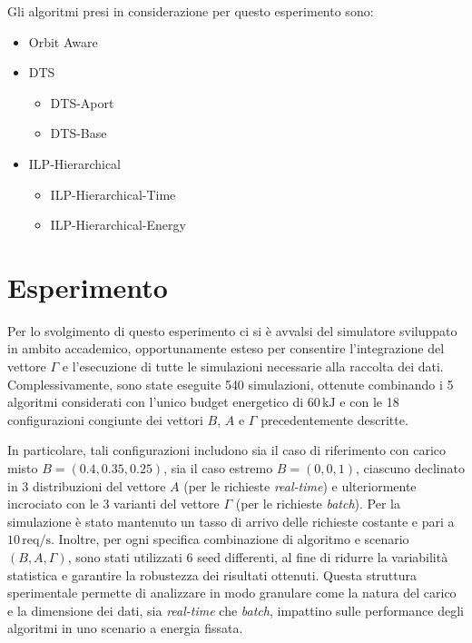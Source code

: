 \documentclass[12pt]{article}
\begin{document}
Gli algoritmi presi in considerazione per questo esperimento sono:
\begin{itemize}
    \item Orbit Aware
    \item DTS
        \begin{itemize}
            \item DTS-Aport
            \item DTS-Base
        \end{itemize}
    \item ILP-Hierarchical
        \begin{itemize}
            \item ILP-Hierarchical-Time
            \item ILP-Hierarchical-Energy
        \end{itemize}
        
\end{itemize}


\section{Esperimento}

Per lo svolgimento di questo esperimento ci si è avvalsi del simulatore sviluppato in ambito accademico, opportunamente esteso per consentire l'integrazione del vettore $\Gamma$ e l'esecuzione di tutte le simulazioni necessarie alla raccolta dei dati. Complessivamente, sono state eseguite 540 simulazioni, ottenute combinando i 5 algoritmi considerati con l'unico budget energetico di $60\,\mathrm{kJ}$ e con le 18 configurazioni congiunte dei vettori $B$, $A$ e $\Gamma$ precedentemente descritte. 

In particolare, tali configurazioni includono sia il caso di riferimento con carico misto $B=(0.4, 0.35, 0.25)$, sia il caso estremo $B=(0,0,1)$, ciascuno declinato in 3 distribuzioni del vettore $A$ (per le richieste \textit{real-time}) e ulteriormente incrociato con le 3 varianti del vettore $\Gamma$ (per le richieste \textit{batch}). Per la simulazione è stato mantenuto un tasso di arrivo delle richieste costante e pari a $10\,\mathrm{req/s}$. Inoltre, per ogni specifica combinazione di algoritmo e scenario $(B,A,\Gamma)$, sono stati utilizzati 6 seed differenti, al fine di ridurre la variabilità statistica e garantire la robustezza dei risultati ottenuti. Questa struttura sperimentale permette di analizzare in modo granulare come la natura del carico e la dimensione dei dati, sia \textit{real-time} che \textit{batch}, impattino sulle performance degli algoritmi in uno scenario a energia fissata.
\end{document}
